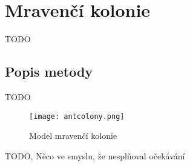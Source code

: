 \section{Mravenčí kolonie}
TODO
\subsection{Popis metody}
TODO

\begin{figure}[H]
	\texttt{[image: antcolony.png]}
	\centering
	\caption{Model mravenčí kolonie}
\end{figure}

TODO, Něco ve smyslu, že nesplňoval očekávání